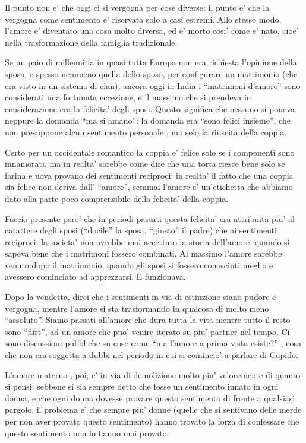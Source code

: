 \documentclass[dvipsnames]{amsart}
\begin{document}
  Il punto non e’ che oggi ci si vergogna per cose diverse: il punto e’ che la vergogna come sentimento e’ riservata solo a casi estremi. Allo stesso modo, l’amore e’ diventato una cosa molto diversa, ed e’ morto cosi’ come e’ nato, cioe’ nella trasformazione della famiglia tradizionale.
  
  Se un paio di millenni fa in quasi tutta Europa non era richiesta l’opinione della sposa, e spesso nemmeno quella dello sposo, per configurare un matrimonio (che era visto in un sistema di clan), ancora oggi in India i “matrimoni d’amore” sono considerati una fortunata eccezione, e il massimo che si prendeva in considerazione era la felicita’ degli sposi. Questo significa che nessuno si poneva neppure la domanda “ma si amano”: la domanda era “sono felici insieme”, che non presuppone alcun sentimento personale , ma solo la riuscita della coppia.
  
  Certo per un occidentale romantico la coppia e’ felice solo se i componenti sono innamorati, ma in realta’ sarebbe come dire che una torta riesce bene solo se farina e uova provano dei sentimenti reciproci: in realta’ il fatto che una coppia sia felice non deriva dall’ “amore”, semmai l’amore e’ un’etichetta che abbiamo dato alla parte poco comprensibile della felicita’ della coppia.
  
  Faccio presente pero’ che in periodi passati questa felicita’ era attribuita piu’ al carattere degli sposi (“docile” la sposa, “giusto” il padre) che ai sentimenti reciproci: la societa’ non avrebbe mai accettato la storia dell’amore, quando si sapeva bene che i matrimoni fossero combinati. Al massimo l’amore sarebbe venuto dopo il matrimonio, quando gli sposi si fossero conosciuti meglio e avessero cominciato ad apprezzarsi. E funzionava.
  
  Dopo la vendetta, direi che i sentimenti in via di estinzione siano pudore e vergogna, mentre l’amore si sta trasformando in qualcosa di molto meno “assoluto”. Siamo passati all’amore che dura tutta la vita mentre tutto il resto sono “flirt”, ad un amore che puo’ venire iterato su piu’ partner nel tempo. Ci sono discussioni pubbliche su cose come “ma l’amore a prima vista esiste?” , cosa che non era soggetta a dubbi nel periodo in cui si comincio’ a parlare di Cupido.
  
  L’amore materno , poi, e’ in via di demolizione molto piu’ velocemente di quanto si pensi: sebbene si sia sempre detto che fosse un sentimento innato in ogni donna, e che ogni donna dovesse provare questo sentimento di fronte a qualsiasi pargolo, il problema e’ che sempre piu’ donne (quelle che si sentivano delle merde per non aver provato questo sentimento) hanno trovato la forza di confessare che questo sentimento non lo hanno mai provato.
  
\end{document}
